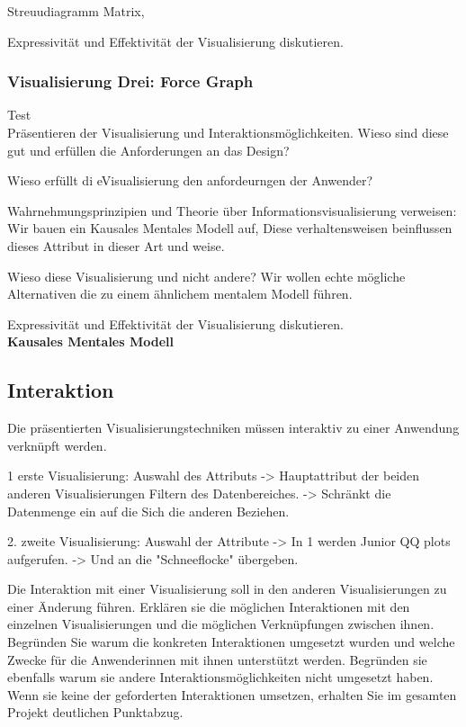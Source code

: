 \documentclass[usegeometry=true]{scrartcl}
\begin{document}
Streuudiagramm Matrix,

Expressivität und Effektivität der Visualisierung diskutieren.\\


\subsubsection{Visualisierung Drei: Force Graph} Test\\
Präsentieren der Visualisierung und Interaktionsmöglichkeiten. 
Wieso sind diese gut und erfüllen die Anforderungen an das Design?

Wieso erfüllt di eVisualisierung den anfordeurngen der Anwender?

Wahrnehmungsprinzipien und Theorie über Informationsvisualisierung verweisen: Wir bauen ein 
Kausales Mentales Modell auf, Diese verhaltensweisen beinflussen dieses Attribut in dieser Art und weise.

Wieso diese Visualisierung und nicht andere? Wir wollen echte mögliche 
Alternativen die zu einem ähnlichem mentalem Modell führen.

Expressivität und Effektivität der Visualisierung diskutieren.\\

\textbf{Kausales Mentales Modell}


\subsection{Interaktion}
Die präsentierten Visualisierungstechniken müssen interaktiv zu einer Anwendung verknüpft werden.

1 erste Visualisierung: Auswahl des Attributs -> Hauptattribut der beiden anderen Visualisierungen
Filtern des Datenbereiches. -> Schränkt die Datenmenge ein auf die Sich die anderen Beziehen.

2. zweite Visualisierung: Auswahl der Attribute -> In 1 werden Junior QQ plots aufgerufen. 
-> Und an die "Schneeflocke" übergeben.


Die Interaktion mit einer Visualisierung soll in den anderen Visualisierungen zu einer Änderung führen. 
Erklären sie die möglichen Interaktionen mit den einzelnen Visualisierungen und die möglichen Verknüpfungen zwischen ihnen.
Begründen Sie warum die konkreten Interaktionen umgesetzt wurden und welche Zwecke für die Anwenderinnen mit ihnen unterstützt werden.
Begründen sie ebenfalls warum sie andere Interaktionsmöglichkeiten nicht umgesetzt haben.
Wenn sie keine der geforderten Interaktionen umsetzen, erhalten Sie im gesamten Projekt deutlichen Punktabzug. 
\end{document}
